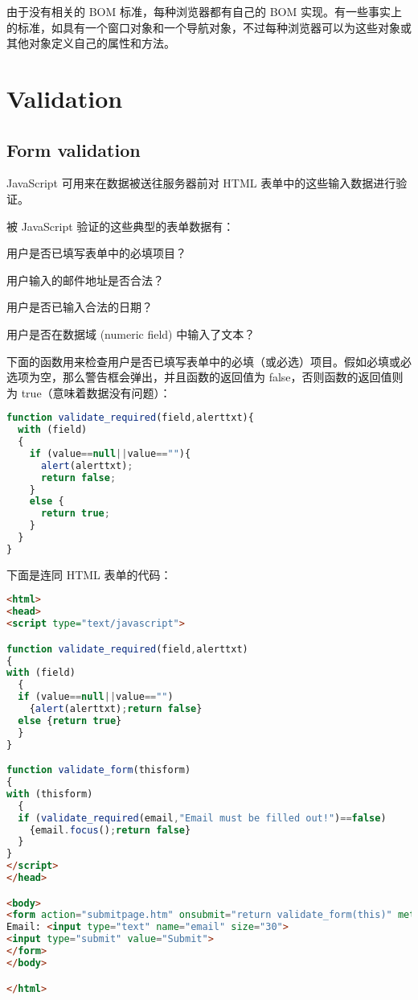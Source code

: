 由于没有相关的 BOM 标准，每种浏览器都有自己的 BOM 实现。有一些事实上的标准，如具有一个窗口对象和一个导航对象，不过每种浏览器可以为这些对象或其他对象定义自己的属性和方法。



\chapter{Validation}



\section{Form validation}

JavaScript 可用来在数据被送往服务器前对 HTML 表单中的这些输入数据进行验证。

被 JavaScript 验证的这些典型的表单数据有：

\begin{compactitem}
\item 用户是否已填写表单中的必填项目？
\item 用户输入的邮件地址是否合法？
\item 用户是否已输入合法的日期？
\item 用户是否在数据域 (numeric field) 中输入了文本？
\end{compactitem}

下面的函数用来检查用户是否已填写表单中的必填（或必选）项目。假如必填或必选项为空，那么警告框会弹出，并且函数的返回值为 false，否则函数的返回值则为 true（意味着数据没有问题）：

\begin{lstlisting}[language=JavaScript]
function validate_required(field,alerttxt){
  with (field)
  {
    if (value==null||value==""){
      alert(alerttxt);
      return false;
    }
    else {
      return true;
    }
  }
}
\end{lstlisting}

下面是连同 HTML 表单的代码：


\begin{lstlisting}[language=HTML]
<html>
<head>
<script type="text/javascript">

function validate_required(field,alerttxt)
{
with (field)
  {
  if (value==null||value=="")
    {alert(alerttxt);return false}
  else {return true}
  }
}

function validate_form(thisform)
{
with (thisform)
  {
  if (validate_required(email,"Email must be filled out!")==false)
    {email.focus();return false}
  }
}
</script>
</head>

<body>
<form action="submitpage.htm" onsubmit="return validate_form(this)" method="post">
Email: <input type="text" name="email" size="30">
<input type="submit" value="Submit"> 
</form>
</body>

</html>
\end{lstlisting}

